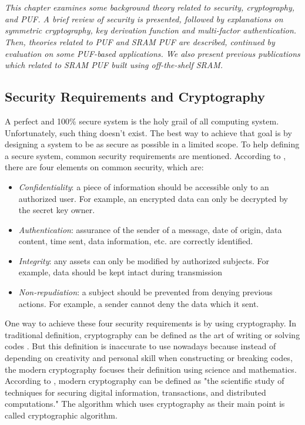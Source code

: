 \chapter{\chapterTwo}
\label{chp:2}

\textit{This chapter examines some background theory related to security, cryptography, and PUF. A brief review of security is presented, followed by explanations on symmetric cryptography, key derivation function and multi-factor authentication.
Then, theories related to PUF and SRAM PUF are described, continued by evaluation on some PUF-based applications. We also present previous publications which related to SRAM PUF built using off-the-shelf SRAM.}

\section{Security Requirements and Cryptography}
\label{chapter2.1}

A perfect and 100\% secure system is the holy grail of all computing system. Unfortunately, such thing doesn't exist. The best way to achieve that goal is by designing a system to be as secure as possible in a limited scope.
To help defining a secure system, common security requirements are mentioned.
According to \cite{cryptography_decrypted}, there are four elements on common security, which are:
\begin{itemize}
  \item \textit{Confidentiality}: a piece of information should be accessible only to an authorized user. For example, an encrypted data can only be decrypted by the secret key owner.
  \item \textit{Authentication}: assurance of the sender of a message, date of origin, data content, time sent, data information, etc. are correctly identified.
  \item \textit{Integrity}: any assets can only be modified by authorized subjects. For example, data should be kept intact during transmission
  \item \textit{Non-repudiation}: a subject should be prevented from denying previous actions. For example, a sender cannot deny the data which it sent.
\end{itemize}

One way to achieve these four security requirements is by using cryptography. In traditional definition, cryptography can be defined as the art of writing or solving codes \cite{Oxford_dictionary}. But this definition is inaccurate to use nowadays because instead of depending on creativity and personal skill when constructing or breaking codes, the modern cryptography focuses their definition using science and mathematics. According to \cite{modern_cryptography}, modern cryptography can be defined as "the scientific study of techniques for securing digital information, transactions, and distributed computations." The algorithm which uses cryptography as their main point is called cryptographic algorithm.

